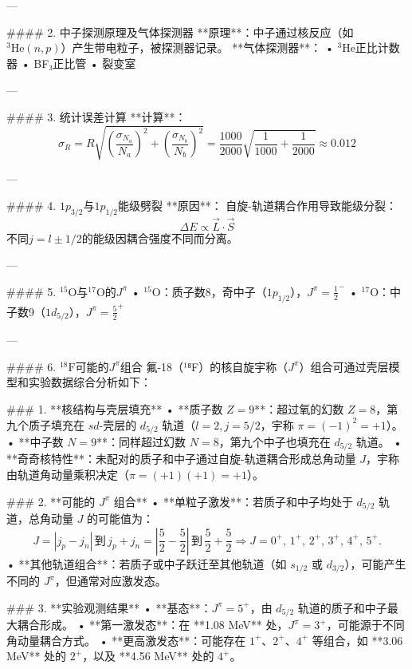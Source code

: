 \documentclass{article}
\begin{document}
---

#### 2. 中子探测原理及气体探测器  
**原理**：中子通过核反应（如\( ^3\text{He}(n,p) \)）产生带电粒子，被探测器记录。  
**气体探测器**：  
• \( ^3\text{He}\)正比计数器  
• BF₃正比管  
• 裂变室  

---

#### 3. 统计误差计算  
**计算**：  
\[
\sigma_R = R \sqrt{\left(\frac{\sigma_{N_a}}{N_a}\right)^2 + \left(\frac{\sigma_{N_b}}{N_b}\right)^2} = \frac{1000}{2000} \sqrt{\frac{1}{1000} + \frac{1}{2000}} \approx 0.012
\]

---

#### 4. \(1p_{3/2}\)与\(1p_{1/2}\)能级劈裂  
**原因**：  
自旋-轨道耦合作用导致能级分裂：  
\[
\Delta E \propto \vec{L} \cdot \vec{S}  
\]  
不同\( j = l \pm 1/2 \)的能级因耦合强度不同而分离。

---

#### 5. \(^{15}\text{O}\)与\(^{17}\text{O}\)的\(J^\pi\)  
• \(^{15}\text{O}\)：质子数8，奇中子（\(1p_{1/2}\)），\(J^\pi = \frac{1}{2}^-\)  
• \(^{17}\text{O}\)：中子数9（\(1d_{5/2}\)），\(J^\pi = \frac{5}{2}^+\)  

---

#### 6. \(^{18}\text{F}\)可能的\(J^\pi\)组合  
氟-18（¹⁸F）的核自旋宇称（\( J^\pi \)）组合可通过壳层模型和实验数据综合分析如下：

### 1. **核结构与壳层填充**
   • **质子数 \( Z = 9 \)**：超过氧的幻数 \( Z = 8 \)，第九个质子填充在 \( sd \)-壳层的 \( d_{5/2} \) 轨道（\( l=2, j=5/2 \)，宇称 \( \pi = (-1)^2 = +1 \)）。
   • **中子数 \( N = 9 \)**：同样超过幻数 \( N = 8 \)，第九个中子也填充在 \( d_{5/2} \) 轨道。
   • **奇奇核特性**：未配对的质子和中子通过自旋-轨道耦合形成总角动量 \( J \)，宇称由轨道角动量乘积决定（\( \pi = (+1)(+1) = +1 \)）。

### 2. **可能的 \( J^\pi \) 组合**
   • **单粒子激发**：若质子和中子均处于 \( d_{5/2} \) 轨道，总角动量 \( J \) 的可能值为：
     \[
     J = \left| j_p - j_n \right| \, \text{到} \, j_p + j_n = \left| \frac{5}{2} - \frac{5}{2} \right| \, \text{到} \, \frac{5}{2} + \frac{5}{2} \Rightarrow J = 0^+,\, 1^+,\, 2^+,\, 3^+,\, 4^+,\, 5^+.
     \]
   • **其他轨道组合**：若质子或中子跃迁至其他轨道（如 \( s_{1/2} \) 或 \( d_{3/2} \)），可能产生不同的 \( J^\pi \)，但通常对应激发态。

### 3. **实验观测结果**
   • **基态**：\( J^\pi = 5^+ \)，由 \( d_{5/2} \) 轨道的质子和中子最大耦合形成。
   • **第一激发态**：在 **1.08 MeV** 处，\( J^\pi = 3^+ \)，可能源于不同角动量耦合方式。
   • **更高激发态**：可能存在 \( 1^+ \)、\( 2^+ \)、\( 4^+ \) 等组合，如 **3.06 MeV** 处的 \( 2^+ \)，以及 **4.56 MeV** 处的 \( 4^+ \)。
\end{document}
